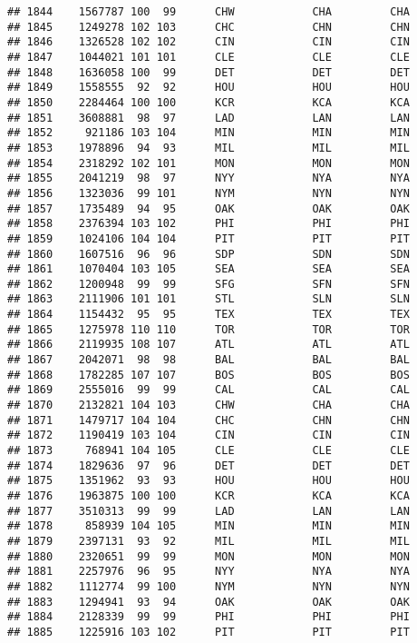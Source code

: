 \documentclass[]{article}
\begin{document}
\begin{verbatim}
## 1844    1567787 100  99      CHW            CHA         CHA
## 1845    1249278 102 103      CHC            CHN         CHN
## 1846    1326528 102 102      CIN            CIN         CIN
## 1847    1044021 101 101      CLE            CLE         CLE
## 1848    1636058 100  99      DET            DET         DET
## 1849    1558555  92  92      HOU            HOU         HOU
## 1850    2284464 100 100      KCR            KCA         KCA
## 1851    3608881  98  97      LAD            LAN         LAN
## 1852     921186 103 104      MIN            MIN         MIN
## 1853    1978896  94  93      MIL            MIL         MIL
## 1854    2318292 102 101      MON            MON         MON
## 1855    2041219  98  97      NYY            NYA         NYA
## 1856    1323036  99 101      NYM            NYN         NYN
## 1857    1735489  94  95      OAK            OAK         OAK
## 1858    2376394 103 102      PHI            PHI         PHI
## 1859    1024106 104 104      PIT            PIT         PIT
## 1860    1607516  96  96      SDP            SDN         SDN
## 1861    1070404 103 105      SEA            SEA         SEA
## 1862    1200948  99  99      SFG            SFN         SFN
## 1863    2111906 101 101      STL            SLN         SLN
## 1864    1154432  95  95      TEX            TEX         TEX
## 1865    1275978 110 110      TOR            TOR         TOR
## 1866    2119935 108 107      ATL            ATL         ATL
## 1867    2042071  98  98      BAL            BAL         BAL
## 1868    1782285 107 107      BOS            BOS         BOS
## 1869    2555016  99  99      CAL            CAL         CAL
## 1870    2132821 104 103      CHW            CHA         CHA
## 1871    1479717 104 104      CHC            CHN         CHN
## 1872    1190419 103 104      CIN            CIN         CIN
## 1873     768941 104 105      CLE            CLE         CLE
## 1874    1829636  97  96      DET            DET         DET
## 1875    1351962  93  93      HOU            HOU         HOU
## 1876    1963875 100 100      KCR            KCA         KCA
## 1877    3510313  99  99      LAD            LAN         LAN
## 1878     858939 104 105      MIN            MIN         MIN
## 1879    2397131  93  92      MIL            MIL         MIL
## 1880    2320651  99  99      MON            MON         MON
## 1881    2257976  96  95      NYY            NYA         NYA
## 1882    1112774  99 100      NYM            NYN         NYN
## 1883    1294941  93  94      OAK            OAK         OAK
## 1884    2128339  99  99      PHI            PHI         PHI
## 1885    1225916 103 102      PIT            PIT         PIT

\end{verbatim}
\end{document}
